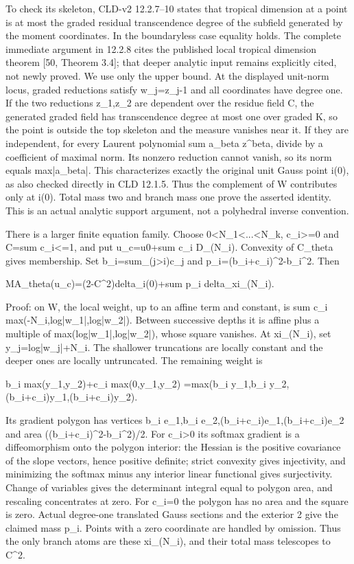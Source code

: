 \documentclass[11pt]{article}
\begin{document}
To check its skeleton, CLD-v2 12.2.7--10 states that tropical dimension at a point is at most the graded residual transcendence degree of the subfield generated by the moment coordinates. In the boundaryless case equality holds. The complete immediate argument in 12.2.8 cites the published local tropical dimension theorem [50, Theorem 3.4]; that deeper analytic input remains explicitly cited, not newly proved. We use only the upper bound. At the displayed unit-norm locus, graded reductions satisfy w\_j=z\_j-1 and all coordinates have degree one. If the two reductions z\_1,z\_2 are dependent over the residue field C, the generated graded field has transcendence degree at most one over graded K, so the point is outside the top skeleton and the measure vanishes near it. If they are independent, for every Laurent polynomial sum a\_beta z\textasciicircum{}beta, divide by a coefficient of maximal norm. Its nonzero reduction cannot vanish, so its norm equals max|a\_beta|. This characterizes exactly the original unit Gauss point i(0), as also checked directly in CLD 12.1.5. Thus the complement of W contributes only at i(0). Total mass two and branch mass one prove the asserted identity. This is an actual analytic support argument, not a polyhedral inverse convention.

There is a larger finite equation family. Choose 0<N\_1<...<N\_k, c\_i>=0 and C=sum c\_i<=1, and put u\_c=u0+sum c\_i D\_(N\_i). Convexity of C\_theta gives membership. Set b\_i=sum\_(j>i)c\_j and p\_i=(b\_i+c\_i)\textasciicircum{}2-b\_i\textasciicircum{}2. Then

MA\_theta(u\_c)=(2-C\textasciicircum{}2)delta\_i(0)+sum p\_i delta\_xi\_(N\_i).

Proof: on W, the local weight, up to an affine term and constant, is sum c\_i max(-N\_i,log|w\_1|,log|w\_2|). Between successive depths it is affine plus a multiple of max(log|w\_1|,log|w\_2|), whose square vanishes. At xi\_(N\_i), set y\_j=log|w\_j|+N\_i. The shallower truncations are locally constant and the deeper ones are locally untruncated. The remaining weight is

b\_i max(y\_1,y\_2)+c\_i max(0,y\_1,y\_2)
=max(b\_i y\_1,b\_i y\_2,(b\_i+c\_i)y\_1,(b\_i+c\_i)y\_2).

Its gradient polygon has vertices b\_i e\_1,b\_i e\_2,(b\_i+c\_i)e\_1,(b\_i+c\_i)e\_2 and area ((b\_i+c\_i)\textasciicircum{}2-b\_i\textasciicircum{}2)/2. For c\_i>0 its softmax gradient is a diffeomorphism onto the polygon interior: the Hessian is the positive covariance of the slope vectors, hence positive definite; strict convexity gives injectivity, and minimizing the softmax minus any interior linear functional gives surjectivity. Change of variables gives the determinant integral equal to polygon area, and rescaling concentrates at zero. For c\_i=0 the polygon has no area and the square is zero. Actual degree-one translated Gauss sections and the exterior 2 give the claimed mass p\_i. Points with a zero coordinate are handled by omission. Thus the only branch atoms are these xi\_(N\_i), and their total mass telescopes to C\textasciicircum{}2.
\end{document}
